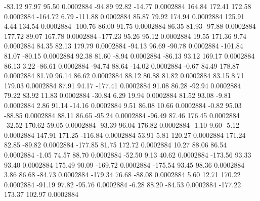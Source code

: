       -83.12       97.97       95.50     0.0002884
      -94.89       92.82      -14.77     0.0002884
      164.84      172.41      172.58     0.0002884
     -164.72        6.79     -111.88     0.0002884
       85.87       79.92      174.94     0.0002884
      125.91        4.44      134.54     0.0002884
     -100.76       86.00       91.75     0.0002884
       86.35       81.93      -97.88     0.0002884
      177.72       89.07      167.78     0.0002884
     -177.23       95.26       95.12     0.0002884
       19.55      171.36        9.74     0.0002884
       84.35       82.13      179.79     0.0002884
      -94.13       96.69      -90.78     0.0002884
     -101.84       81.07      -80.15     0.0002884
       92.38       81.60       -8.94     0.0002884
      -86.13       93.12      169.17     0.0002884
       86.13        3.22      -86.61     0.0002884
      -94.74       88.64      -14.02     0.0002884
       -0.67       84.49      178.87     0.0002884
       81.70       96.14       86.62     0.0002884
       88.12       80.88       81.82     0.0002884
       83.15        8.71      179.03     0.0002884
       87.91       94.17     -177.41     0.0002884
       91.08       86.28      -92.94     0.0002884
       79.22       83.92       11.83     0.0002884
      -30.84        6.29       19.94     0.0002884
       81.52       93.08       -9.81     0.0002884
        2.86       91.14      -14.16     0.0002884
        9.51       86.08       10.66     0.0002884
       -0.82       95.03      -88.85     0.0002884
       88.11       86.65      -95.24     0.0002884
      -96.49       87.46      176.45     0.0002884
      -32.52      170.62       59.05     0.0002884
      -93.39       96.04      176.82     0.0002884
       -1.10        9.60       -5.12     0.0002884
      147.91      171.25     -116.84     0.0002884
       53.91        5.81      120.27     0.0002884
      171.24       82.85      -89.82     0.0002884
     -177.85       81.75      172.72     0.0002884
       10.27       88.06       86.54     0.0002884
       -1.05       74.57       88.70     0.0002884
      -52.50        9.13       40.62     0.0002884
     -173.56       93.33       93.40     0.0002884
      175.49       90.09     -169.72     0.0002884
     -175.54       93.45       98.36     0.0002884
        3.86       86.68      -84.73     0.0002884
     -179.34       76.68      -88.08     0.0002884
        5.60       12.71      170.22     0.0002884
      -91.19       97.82      -95.76     0.0002884
       -6.28       88.20      -84.53     0.0002884
     -177.22      173.37      102.97     0.0002884
